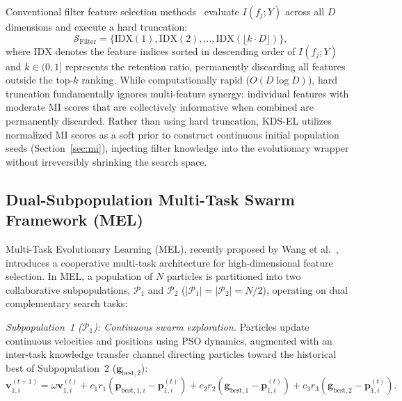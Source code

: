 Conventional filter feature selection methods~\cite{peng2005,deng2025nns} evaluate $I(f_j; Y)$ across all $D$ dimensions and execute a hard truncation:
\begin{equation}
\mathcal{S}_{\mathrm{Filter}} = \bigl\{\mathrm{IDX}(1), \mathrm{IDX}(2), \ldots, \mathrm{IDX}(\lfloor k \cdot D \rfloor)\bigr\},
\label{eq:hard_filter}
\end{equation}
where $\mathrm{IDX}$ denotes the feature indices sorted in descending order of $I(f_j; Y)$ and $k \in (0, 1]$ represents the retention ratio, permanently discarding all features outside the top-$k$ ranking. While computationally rapid ($O(D \log D)$), hard truncation fundamentally ignores multi-feature synergy: individual features with moderate MI scores that are collectively informative when combined are permanently discarded. Rather than using hard truncation, KDS-EL utilizes normalized MI scores as a soft prior to construct continuous initial population seeds (Section~\ref{sec:mi}), injecting filter knowledge into the evolutionary wrapper without irreversibly shrinking the search space.

\subsection{Dual-Subpopulation Multi-Task Swarm Framework (MEL)}\label{sec:mel}

Multi-Task Evolutionary Learning (MEL), recently proposed by Wang et al.~\cite{mel2024}, introduces a cooperative multi-task architecture for high-dimensional feature selection. In MEL, a population of $N$ particles is partitioned into two collaborative subpopulations, $\mathcal{P}_1$ and $\mathcal{P}_2$ ($|\mathcal{P}_1| = |\mathcal{P}_2| = N/2$), operating on dual complementary search tasks:

\textit{Subpopulation~1 ($\mathcal{P}_1$): Continuous swarm exploration.} Particles update continuous velocities and positions using PSO dynamics, augmented with an inter-task knowledge transfer channel directing particles toward the historical best of Subpopulation~2 ($\mathbf{g}_{\mathrm{best},2}$):
\begin{equation}
\mathbf{v}_{1,i}^{(t+1)} = \omega \mathbf{v}_{1,i}^{(t)} + c_1 r_1 (\mathbf{p}_{\mathrm{best},1,i} - \mathbf{p}_{1,i}^{(t)}) + c_2 r_2 (\mathbf{g}_{\mathrm{best},1} - \mathbf{p}_{1,i}^{(t)}) + c_3 r_3 (\mathbf{g}_{\mathrm{best},2} - \mathbf{p}_{1,i}^{(t)}).
\label{eq:mel_sub1}
\end{equation}

